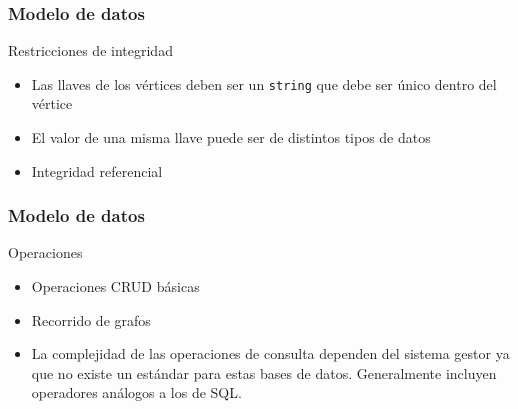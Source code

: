 \begin{frame}
    \frametitle{Modelo de datos}

    \begin{block}{Restricciones de integridad}
        \begin{itemize}
            \item Las llaves de los vértices deben ser un \texttt{string} que debe ser único dentro del vértice
            \item El valor de una misma llave puede ser de distintos tipos de datos
            \item Integridad referencial
        \end{itemize}

    \end{block}

\end{frame}

\begin{frame}
    \frametitle{Modelo de datos}

    \begin{block}{Operaciones}
        \begin{itemize}
            \item Operaciones CRUD básicas
            \item Recorrido de grafos
            \item La complejidad de las operaciones de consulta dependen del sistema gestor ya que no existe un estándar para
            estas bases de datos. Generalmente incluyen operadores análogos a los de SQL.
        \end{itemize}

    
    \end{block}

\end{frame}

